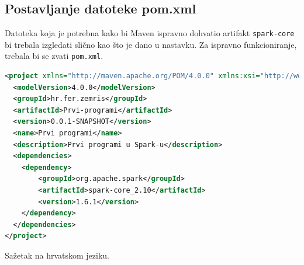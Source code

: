 \documentclass[times, utf8, zavrsni]{fer}
\begin{document}
\newpage
\begin{appendices}
\chapter{Postavljanje datoteke pom.xml}
\label{ch:datotekapomXML}
Datoteka koja je potrebna kako bi Maven ispravno dohvatio artifakt \texttt{spark-core} bi trebala izgledati slično kao što je dano u nastavku. Za ispravno funkcioniranje, trebala bi se zvati \texttt{pom.xml}.
\begin{lstlisting}[language=XML]
<project xmlns="http://maven.apache.org/POM/4.0.0" xmlns:xsi="http://www.w3.org/2001/XMLSchema-instance" xsi:schemaLocation="http://maven.apache.org/POM/4.0.0 http://maven.apache.org/xsd/maven-4.0.0.xsd">
  <modelVersion>4.0.0</modelVersion>
  <groupId>hr.fer.zemris</groupId>
  <artifactId>Prvi-programi</artifactId>
  <version>0.0.1-SNAPSHOT</version>
  <name>Prvi programi</name>
  <description>Prvi programi u Spark-u</description>
  <dependencies>
  	<dependency>
  		<groupId>org.apache.spark</groupId>
  		<artifactId>spark-core_2.10</artifactId>
  		<version>1.6.1</version>
  	</dependency>
  </dependencies>
</project>
\end{lstlisting}
\end{appendices}

\begin{sazetak}
Sažetak na hrvatskom jeziku.

\end{sazetak}

\begin{abstract}
Abstract.

\end{abstract}
\end{document}
